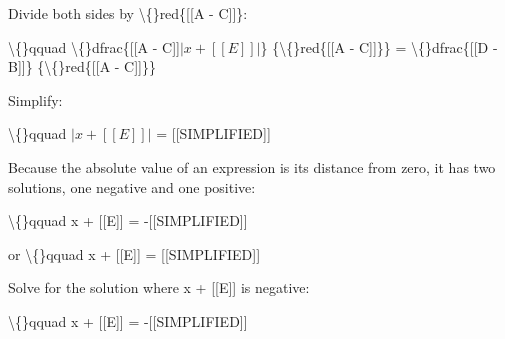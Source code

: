 \documentclass{article}
\begin{document}
\begin{itemize}
                        
                        
                            
                                Divide both sides by
                                \textbackslash\{\}red\{[[A - C]]\}:
                            
                            \textbackslash\{\}qquad
                                \textbackslash\{\}dfrac\{[[A - C]]$| x + [[E]] |$\}
                                    \{\textbackslash\{\}red\{[[A - C]]\}\} =
                                \textbackslash\{\}dfrac\{[[D - B]]\}
                                    \{\textbackslash\{\}red\{[[A - C]]\}\}
                            
                        
                        
                            Simplify:
                            
                                \textbackslash\{\}qquad $| x + [[E]] |$ =
                                [[SIMPLIFIED]]
                            
                        
                        
                            
                                
                                    Because the absolute value of an expression
                                    is its distance from zero, it has two
                                    solutions, one negative and one positive:
                                
                                \textbackslash\{\}qquad
                                    x + [[E]] = -[[SIMPLIFIED]]
                                
                                or
                                \textbackslash\{\}qquad
                                    x + [[E]] = [[SIMPLIFIED]]
                                
                            
                            
                                
                                    Solve for the solution where
                                    x + [[E]] is negative:
                                
                                \textbackslash\{\}qquad
                                    x + [[E]] = -[[SIMPLIFIED]]
                                
                            
                            

\end{itemize}
\end{document}
